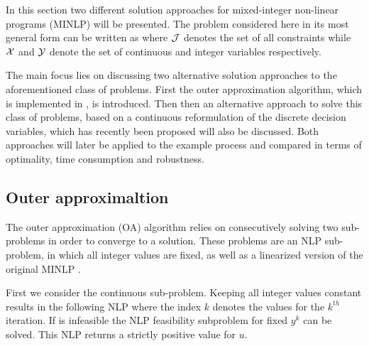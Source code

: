
In this section two different solution approaches for mixed-integer non-linear programs (MINLP) will be presented.
The problem considered here in its most general form can be written as
where $\mathcal{J}$ denotes the set of all constraints while $\mathcal{X}$ and $\mathcal{Y}$ denote the set 
of continuous and integer variables respectively. 
    
The main focus lies on discussing two alternative solution approaches to the aforementioned class of problems.
First the outer approximation algorithm, which is implemented in \gproms, is introduced.
Then then an alternative approach to solve this class of problems, based on a continuous reformulation of
the discrete decision variables, which has recently been proposed \cite{Kraemer.2010,Stein.2004} will also be
discussed. Both approaches will later be applied to the example process and compared in terms of optimality,
time consumption and robustness.

    \subsection{Outer approximaltion}
        The outer approximation (OA) algorithm relies on consecutively solving two sub-problems in order to
        converge to a solution. These problems are an NLP sub-problem, in which all integer values are fixed, 
        as well as a linearized version of the original MINLP . 
        
        First we consider the continuous sub-problem. Keeping all integer values constant
        results in the following NLP
        where the index $k$ denotes the values for the $k^{th}$ iteration. 
        If  is infeasible the NLP feasibility subproblem for fixed $y^k$ can be solved.
        This NLP returns a strictly positive value for $u$.

